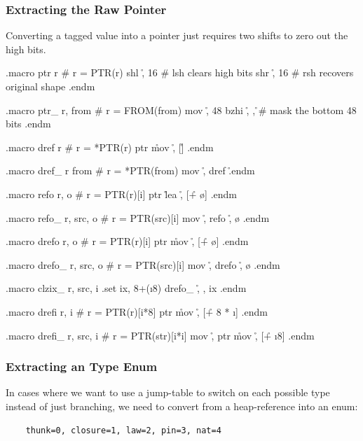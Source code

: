 \subsubsection{Extracting the Raw Pointer}

Converting a tagged value into a pointer just requires two shifts to
zero out the high bits.

\begin{asm}
.macro ptr r                                # r = PTR(r)
	shl	\r, 16                      # lsh clears high bits
	shr	\r, 16                      # rsh recovers original shape
.endm

.macro ptr_ r, from                         # r = FROM(from)
	mov	\r, 48
	bzhi	\r, \from, \r		    # mask the bottom 48 bits
.endm

.macro dref r                               # r = *PTR(r)
	ptr	\r
	mov	\r, [\r]
.endm

.macro dref_ r from                         # r = *PTR(from)
	mov	\r, \from
	dref	\r
.endm

.macro refo r, o                           # r = PTR(r)[i]
	ptr	\r
	lea	\r, [\r + \o]
.endm

.macro refo_ r, src, o                     # r = PTR(src)[i]
	mov	\r, \src
	refo	\r, \o
.endm

.macro drefo r, o                           # r = PTR(r)[i]
	ptr	\r
	mov	\r, [\r + \o]
.endm

.macro drefo_ r, src, o                     # r = PTR(src)[i]
	mov	\r, \src
	drefo	\r, \o
.endm

.macro clzix_ r, src, i
	.set	ix, 8+(\i * 8)
	drefo_	\r, \src, ix
.endm

.macro drefi r, i                           # r = PTR(r)[i*8]
	ptr	\r
	mov	\r, [\r + 8 * \i]
.endm

.macro drefi_ r, src, i                     # r = PTR(str)[i*i]
	mov	\r, \src
	ptr	\r
	mov	\r, [\r + \i * 8]
.endm
\end{asm}

\subsubsection{Extracting an Type Enum}

In cases where we want to use a jump-table to switch on each possible
type instead of just branching, we need to convert from a heap-reference
into an enum:

\begin{verbatim}
    thunk=0, closure=1, law=2, pin=3, nat=4
\end{verbatim}

